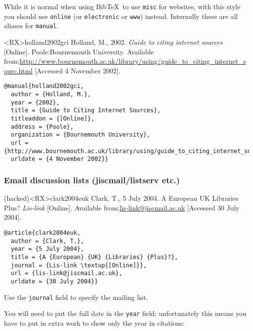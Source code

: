 \documentclass[10pt,a4paper]{article}
\newenvironment{tips}{%
  \begin{list}{\makebox[2em][c]{\faLightbulbO}}{%
    \setlength{\leftmargin}{2em}
    \setlength{\labelwidth}{2em}
    \setlength{\labelsep}{0pt}}
}{\end{list}}
\newenvironment{hacks}{%
  \begin{list}{\makebox[2em][c]{\faWrench}}{%
    \setlength{\leftmargin}{2em}
    \setlength{\labelwidth}{2em}
    \setlength{\labelsep}{0pt}}
}{\end{list}}
\begin{document}
While it is normal when using Bib\TeX\ to use \texttt{misc} for websites,
with this style you should use \texttt{online} (or \texttt{electronic} or \texttt{www}) instead.
Internally these are all aliases for \texttt{manual}.

\begin{bibexbox}<RX>{holland2002gci}
  Holland, M., 2002. \emph{Guide to citing internet sources} [Online]. Poole:\@ Bournemouth University. Available from:\@ \url{http://www.bournemouth.ac.uk/library/using/guide_to_citing_internet_sourc.html} [Accessed 4 November 2002].
  \tcblower
\begin{Verbatim}
@manual{holland2002gci,
  author = {Holland, M.},
  year = {2002},
  title = {Guide to Citing Internet Sources},
  titleaddon = {[Online]},
  address = {Poole},
  organization = {Bournemouth University},
  url = {http://www.bournemouth.ac.uk/library/using/guide_to_citing_internet_sourc.html},
  urldate = {4 November 2002}}
\end{Verbatim}
\end{bibexbox}

\subsubsection*{Email discussion lists (jiscmail\slash listserv etc.)}

\begin{bibexbox}(hacked)<RX>{clark2004euk}
  Clark, T., 5 July 2004. A European UK Libraries Plus? \emph{Lis-link} [Online]. Available from:\@ \url{lis-link@jiscmail.ac.uk} [Accessed 30 July 2004].
  \tcblower
\begin{Verbatim}
@article{clark2004euk,
  author = {Clark, T.},
  year = {5 July 2004},
  title = {A {European} {UK} {Libraries} {Plus}?},
  journal = {Lis-link \textup{[Online]}},
  url = {lis-link@jiscmail.ac.uk},
  urldate = {30 July 2004}}
\end{Verbatim}
\end{bibexbox}

\begin{tips}
\item Use the \texttt{journal} field to specify the mailing list.
\end{tips}

\begin{hacks}
\item You will need to put the full date in the \texttt{year} field;
unfortunately this means you have to put in extra work to show only the year in citations:
\end{hacks}
\end{document}
